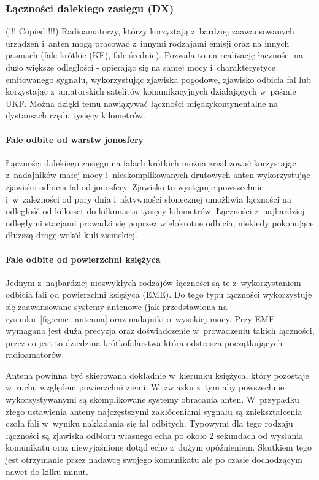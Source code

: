 \documentclass[]{mgr}
\begin{document}
                \subsubsection{Łączności dalekiego zasięgu (DX)}
                (!!! Copied !!!) Radioamatorzy, którzy korzystają z~bardziej zaawansowanych urządzeń i~anten mogą pracować z~innymi rodzajami emisji oraz na innych pasmach (fale krótkie (KF), fale średnie). Pozwala to na realizację łączności na dużo większe odległości - opierając się na samej mocy i~charakterystyce emitowanego sygnału, wykorzystując zjawiska pogodowe, zjawisko odbicia fal lub korzystając z~amatorskich satelitów komunikacyjnych działających w~paśmie UKF. Można dzięki temu nawiązywać łączności międzykontynentalne na dystansach rzędu tysięcy kilometrów.

                    \paragraph{Fale odbite od warstw jonosfery}
                    Łączności dalekiego zasięgu na falach krótkich można zrealizować korzystając z~nadajników małej mocy i~nieskomplikowanych drutowych anten wykorzystując zjawisko odbicia fal od jonosfery. Zjawisko to występuje powszechnie i~w~zależności od pory dnia i~aktywności słonecznej umożliwia łączności na odległość od kilkuset do kilkunastu tysięcy kilometrów. Łączności z~najbardziej odległymi stacjami prowadzi się poprzez wielokrotne odbicia, niekiedy pokonujące dłuższą drogę wokół kuli ziemskiej.

                    \paragraph{Fale odbite od powierzchni księżyca}
                    Jednym z~najbardziej niezwykłych rodzajów łączności są te z~wykorzystaniem odbicia fali od powierzchni księżyca (EME). Do tego typu łączności wykorzystuje się zaawansowane systemy antenowe (jak przedstawiona na rysunku~\ref{fig:eme_antenna} oraz nadajniki o~wysokiej mocy. Przy EME wymagana jest duża precyzja oraz doświadczenie w~prowadzeniu takich łączności, przez co jest to dziedzina krótkofalarstwa która odstrasza początkujących radioamatorów. 

                    Antena powinna być skierowana dokładnie w~kierunku księżyca, który pozostaje w~ruchu względem powierzchni ziemi. W~związku z~tym aby powszechnie wykorzystywanymi są skomplikowane systemy obracania anten. W~przypadku złego ustawienia anteny najczęstszymi zakłóceniami sygnału są zniekształcenia czoła fali w~wyniku nakładania się fal odbitych. Typowymi dla tego rodzaju łączności są zjawiska odbioru własnego echa po około 2 sekundach od wysłania komunikatu oraz niewyjaśnione dotąd echo z~dużym opóźnieniem. Skutkiem tego jest otrzymanie przez nadawcę swojego komunikatu ale po czasie dochodzącym nawet do kilku minut.
\end{document}

